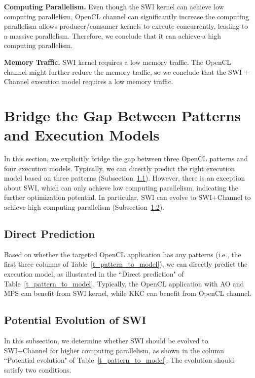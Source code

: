 {\bf Computing Parallelism. }Even though the SWI kernel can achieve low computing parallelism, OpenCL channel can significantly increase the computing parallelism allows producer/consumer kernels to execute concurrently, leading to a massive parallelism. Therefore, we conclude that it can achieve a high computing parallelism.  

{\bf Memory Traffic. }SWI kernel requires a low memory traffic. The OpenCL channel might further reduce the memory traffic, so we conclude that the SWI + Channel execution model requires a low memory traffic. 



\vspace{-1ex}
\section{Bridge the Gap Between Patterns and Execution Models}%
\label{sec_bridge_gap}
In this section, we explicitly bridge the gap between three OpenCL patterns and four execution models. Typically, we can directly predict the right execution model based on three patterns (Subsection~\ref{subsec_direct_prediction}). However, there is an exception about SWI, which can only achieve low computing parallelism, indicating the further optimization potential. In particular, SWI can evolve to SWI+Channel to achieve high computing parallelism (Subsection~\ref{subsec_potential_prediction}).  

\vspace{-1ex}
\subsection{Direct Prediction}
\label{subsec_direct_prediction}
Based on whether the targeted OpenCL application has any patterns (i.e., the first three columns of Table~\ref{t_pattern_to_model}), we can directly predict the execution model, as illustrated in the ``Direct prediction" of Table~\ref{t_pattern_to_model}. Typically, the OpenCL application with AO and MPS can benefit from SWI kernel, while KKC can benefit from OpenCL channel.%
\vspace{-1ex}
\subsection{Potential Evolution of SWI}
\label{subsec_potential_prediction}
In this subsection, we determine whether SWI should be evolved to SWI+Channel for higher computing parallelism, as shown in the column ``Potential evolution" of Table~\ref{t_pattern_to_model}. The evolution should satisfy two conditions. 

